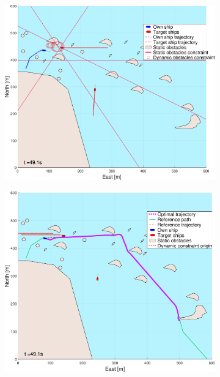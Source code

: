 \begin{figure}[!ht]
\begin{subfigure}[b]{0.494\textwidth}
        \subcaption{}
    \end{subfigure}
    \hfill
    \\
    \begin{subfigure}[b]{0.494\textwidth}
        \centering
        \includegraphics[width=\textwidth]{Images/NewFigures/skjergard_m_trafikk_NEW/_Simple_1fig1_time=50}
        \subcaption{}
    \end{subfigure}
    \hfill
    \begin{subfigure}[b]{0.494\textwidth}
        \centering
        \includegraphics[width=\textwidth]{Images/NewFigures/skjergard_m_trafikk_NEW/_Simple_1fig999_time=50}

\end{subfigure}
\end{figure}
